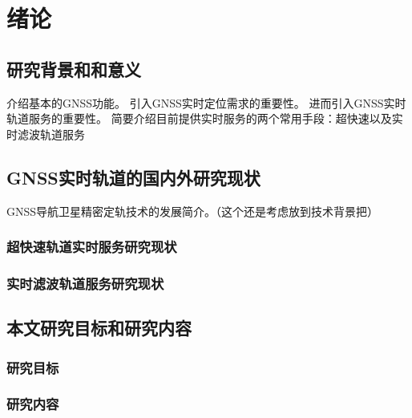 
\chapter{绪论}

\section{研究背景和和意义}
介绍基本的GNSS功能。
引入GNSS实时定位需求的重要性。
进而引入GNSS实时轨道服务的重要性。
简要介绍目前提供实时服务的两个常用手段：超快速以及实时滤波轨道服务
\section{GNSS实时轨道的国内外研究现状}
GNSS导航卫星精密定轨技术的发展简介。（这个还是考虑放到技术背景把）

\subsection{超快速轨道实时服务研究现状}

\subsection{实时滤波轨道服务研究现状}

\section{本文研究目标和研究内容}

\subsection{研究目标}

\subsection{研究内容}
